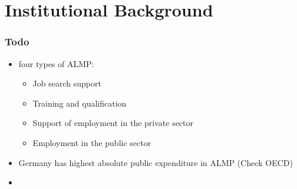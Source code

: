 
\section{Institutional Background}\label{sec:inst}

\subsubsection{Todo}

\begin{itemize}
\item four types of ALMP\citep{oecd2006,kluve2013aktive}:
\begin{itemize}
    \item Job search support
    \item Training and qualification
    \item Support of employment in the private sector
    \item Employment in the public sector
\end{itemize}
    \item Germany has highest absolute public expenditure in ALMP \citep{kluve2013aktive} (Check OECD)
    \item 


\end{itemize}
